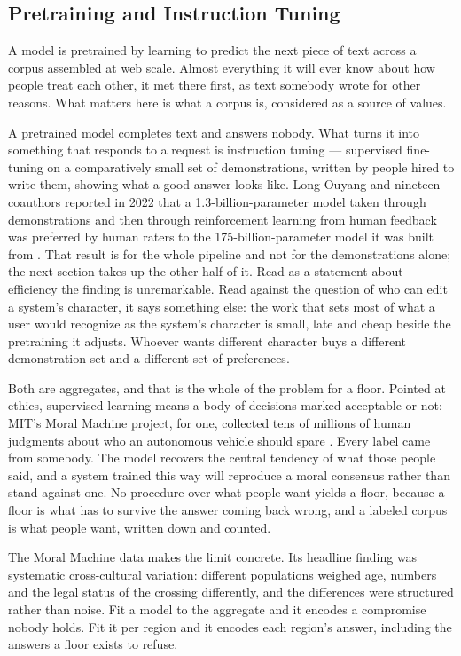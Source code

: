 \subsection{Pretraining and Instruction Tuning}
\label{sec:4.2.1}
A model is pretrained by learning to predict the next piece of text across a corpus assembled at web scale. Almost everything it will ever know about how people treat each other, it met there first, as text somebody wrote for other reasons. What matters here is what a corpus is, considered as a source of values.

A pretrained model completes text and answers nobody. What turns it into something that responds to a request is instruction tuning — supervised fine-tuning on a comparatively small set of demonstrations, written by people hired to write them, showing what a good answer looks like. Long Ouyang and nineteen coauthors reported in 2022 that a 1.3-billion-parameter model taken through demonstrations and then through reinforcement learning from human feedback was preferred by human raters to the 175-billion-parameter model it was built from \autocite{ouyang2022training}. That result is for the whole pipeline and not for the demonstrations alone; the next section takes up the other half of it. Read as a statement about efficiency the finding is unremarkable. Read against the question of who can edit a system's character, it says something else: the work that sets most of what a user would recognize as the system's character is small, late and cheap beside the pretraining it adjusts. Whoever wants different character buys a different demonstration set and a different set of preferences.

Both are aggregates, and that is the whole of the problem for a floor. Pointed at ethics, supervised learning means a body of decisions marked acceptable or not: MIT's Moral Machine project, for one, collected tens of millions of human judgments about who an autonomous vehicle should spare \autocite{awad2018moral}. Every label came from somebody. The model recovers the central tendency of what those people said, and a system trained this way will reproduce a moral consensus rather than stand against one. No procedure over what people want yields a floor, because a floor is what has to survive the answer coming back wrong, and a labeled corpus is what people want, written down and counted.

The Moral Machine data makes the limit concrete. Its headline finding was systematic cross-cultural variation: different populations weighed age, numbers and the legal status of the crossing differently, and the differences were structured rather than noise. Fit a model to the aggregate and it encodes a compromise nobody holds. Fit it per region and it encodes each region's answer, including the answers a floor exists to refuse.

